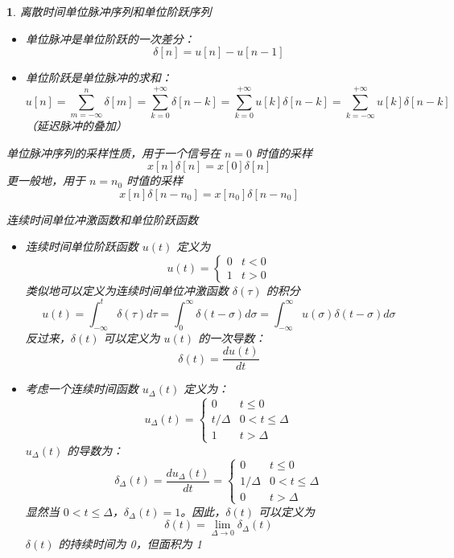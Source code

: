 \documentclass[UTF8]{report}
\theoremstyle{MyLineTheoremStyle} %
\theoremstyle{MyBlockTheoremStyle} %
\theoremstyle{MySubsubsectionStyle} %
\newtheorem{definition}{}
\begin{document}
\begin{definition}
    离散时间单位脉冲序列和单位阶跃序列
    \begin{itemize}
        \item 单位脉冲是单位阶跃的一次差分：
        \[
        \delta[n] = u[n] - u[n - 1]
        \]
        \item 单位阶跃是单位脉冲的求和：
        \[
        u[n] = \sum_{m=-\infty}^{n} \delta[m] = \sum_{k=0}^{+\infty} \delta[n - k] = \sum_{k=0}^{+\infty} u[k]\delta[n - k] = \sum_{k=-\infty}^{+\infty} u[k]\delta[n - k]
        \]
        （延迟脉冲的叠加）
    \end{itemize}

    单位脉冲序列的采样性质，用于一个信号在 $n = 0$ 时值的采样
    \[
    x[n] \delta[n] = x[0] \delta[n]
    \]
    更一般地，用于 $n = n_0$ 时值的采样
    \[
    x[n] \delta[n - n_0] = x[n_0] \delta[n - n_0]
    \]

    连续时间单位冲激函数和单位阶跃函数
    \begin{itemize}
        \item 连续时间单位阶跃函数 $u(t)$ 定义为
        \[
        u(t) = \begin{cases} 
        0 & t < 0 \\
        1 & t > 0 
        \end{cases}
        \]
        类似地可以定义为连续时间单位冲激函数 $\delta(\tau)$ 的积分
        \[
        u(t) = \int_{-\infty}^{t} \delta(\tau) d\tau = \int_{0}^{\infty} \delta(t - \sigma) d\sigma = \int_{-\infty}^{\infty} u(\sigma)\delta(t - \sigma) d\sigma
        \]
        反过来，$\delta(t)$ 可以定义为 $u(t)$ 的一次导数：
        \[
        \delta(t) = \frac{d u(t)}{d t}
        \]

        \item 考虑一个连续时间函数 $u_\Delta(t)$ 定义为：
        \[
        u_\Delta(t) = \begin{cases} 
        0 & t \leq 0 \\
        t/\Delta & 0 < t \leq \Delta \\
        1 & t > \Delta 
        \end{cases}
        \]
        $u_\Delta(t)$ 的导数为：
        \[
        \delta_\Delta(t) = \frac{d u_\Delta(t)}{d t} = \begin{cases} 
        0 & t \leq 0 \\
        1/\Delta & 0 < t \leq \Delta \\
        0 & t > \Delta 
        \end{cases}
        \]
        显然当 $0 < t \leq \Delta$，$\delta_\Delta(t) = 1$。因此，$\delta(t)$ 可以定义为
        \[
        \delta(t) = \lim_{\Delta \to 0} \delta_\Delta(t)
        \]
        $\delta(t)$ 的持续时间为 0，但面积为 1
    \end{itemize}


\end{definition}
\end{document}
